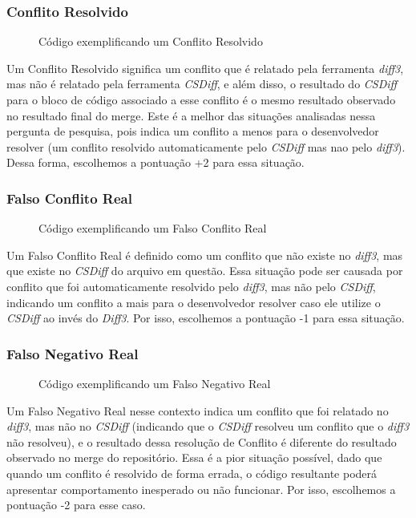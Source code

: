 \subsubsection{Conflito Resolvido}
\begin{figure}[ht]
	\begin{center}
        
		\caption{Código exemplificando um Conflito Resolvido}\label{conflito_resolvido}
	\end{center}
\end{figure}
Um Conflito Resolvido significa um conflito que é relatado pela ferramenta \emph{diff3},
mas não é relatado pela ferramenta \emph{CSDiff}, e
além disso, o resultado do \emph{CSDiff} para o bloco de código associado a esse conflito é o mesmo resultado
observado no resultado
final do merge. Este é a melhor das situações analisadas nessa pergunta de pesquisa, pois indica um conflito a menos para o
desenvolvedor resolver (um conflito resolvido automaticamente pelo \emph{CSDiff} mas nao pelo \emph{diff3}). Dessa forma,
escolhemos a pontuação +2 para essa situação.
\subsubsection{Falso Conflito Real}
\begin{figure}[ht]
	\begin{center}
        
		\caption{Código exemplificando um Falso Conflito Real}\label{falso_conflito_real}
	\end{center}
\end{figure}
Um Falso Conflito Real é definido como um conflito que não existe
no \emph{diff3}, mas que existe no \emph{CSDiff} do arquivo em questão. Essa
situação pode ser causada por conflito que foi automaticamente
resolvido pelo \emph{diff3}, mas não pelo \emph{CSDiff}, indicando um conflito
a mais para o desenvolvedor resolver caso ele utilize o \emph{CSDiff}
ao invés do \emph{Diff3}. Por isso, escolhemos a pontuação -1 para essa
situação.
\subsubsection{Falso Negativo Real}
\begin{figure}[ht]
	\begin{center}
        
		\caption{Código exemplificando um Falso Negativo Real}\label{falso_negativo_real}
	\end{center}
\end{figure}
Um Falso Negativo Real nesse contexto indica um conflito que foi relatado no
\emph{diff3}, mas não no \emph{CSDiff} (indicando que
o \emph{CSDiff} resolveu um conflito que o \emph{diff3} não resolveu),
e o resultado dessa resolução de Conflito é diferente do resultado
observado no merge do repositório. Essa é a pior situação possível,
dado que quando um conflito é resolvido de forma errada,
o código resultante poderá apresentar comportamento inesperado ou não funcionar. Por
isso, escolhemos a pontuação -2 para esse caso.

